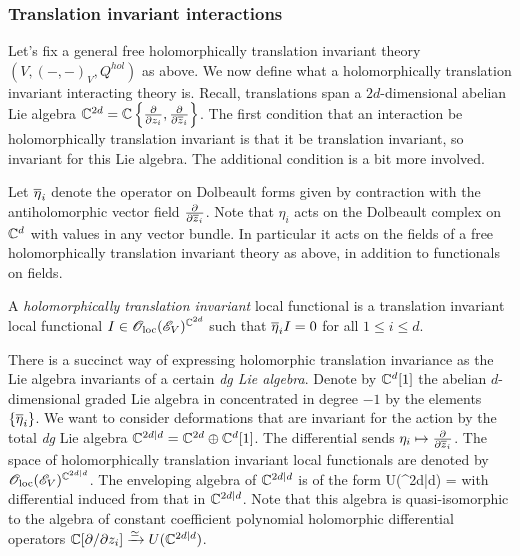 \documentclass[10pt]{amsart}
\begin{document}
\subsubsection{Translation invariant interactions}


Let's fix a general free holomorphically translation invariant theory $(V, (-,-)_V, Q^{hol})$ as above.
We now define what a holomorphically translation invariant interacting theory is.
Recall, translations span a $2d$-dimensional abelian Lie algebra $\CC^{2d} = \CC\left\{\frac{\partial}{\partial z_i}, \frac{\partial}{\partial \zbar_i}\right\}$. 
The first condition that an interaction be holomorphically translation invariant is that it be translation invariant, so invariant for this Lie algebra.
The additional condition is a bit more involved.

Let $\Bar{\eta}_i$ denote the operator on Dolbeault forms given by contraction with the antiholomorphic vector field $\frac{\partial}{\partial \zbar_i}$. 
Note that $\eta_i$ acts on the Dolbeault complex on $\CC^d$ with values in any vector bundle.
In particular it acts on the fields of a free holomorphically translation invariant theory as above, in addition to functionals on fields.

\begin{dfn}
A {\em holomorphically translation invariant} local functional is a translation invariant local functional $I \in \oloc(\sE_V)^{\CC^{2d}}$ such that $\Bar{\eta}_i I = 0$ for all $1 \leq i \leq d$. 
\end{dfn}

There is a succinct way of expressing holomorphic translation invariance as the Lie algebra invariants of a certain {\em dg Lie algebra}.
Denote by $\CC^d[1]$ the abelian $d$-dimensional graded Lie algebra in concentrated in degree $-1$ by the elements $\{\Bar{\eta}_i\}$.
We want to consider deformations that are invariant for the action by the total {\em dg} Lie algebra $\CC^{2d|d} = \CC^{2d} \oplus \CC^d[1]$.
The differential sends $\eta_i \mapsto \frac{\partial}{\partial \zbar_i}$.
The space of holomorphically translation invariant local functionals are denoted by $\oloc(\sE_V)^{\CC^{2d|d}}$.
The enveloping algebra of $\CC^{2d|d}$ is of the form
\ben
U(\CC^{2d|d}) = \CC {}
\een
with differential induced from that in $\CC^{2d|d}$. 
Note that this algebra is quasi-isomorphic to the algebra of constant coefficient polynomial holomorphic differential operators $\CC[\partial / \partial z_i] \xto{\simeq} U(\CC^{2d|d})$. 
\end{document}
